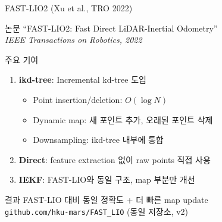 \begin{frame}{FAST-LIO2 (Xu et al., TRO 2022)}
  \begin{block}{논문}
    ``FAST-LIO2: Fast Direct LiDAR-Inertial Odometry''\\
    \textit{IEEE Transactions on Robotics, 2022}
  \end{block}
  \pause
  \begin{block}{주요 기여}
    \begin{enumerate}
      \item \textbf{ikd-tree}: Incremental kd-tree 도입
        \begin{itemize}
          \item Point insertion/deletion: $O(\log N)$
          \item Dynamic map: 새 포인트 추가, 오래된 포인트 삭제
          \item Downsampling: ikd-tree 내부에 통합
        \end{itemize}
      \item \textbf{Direct}: feature extraction 없이 raw points 직접 사용
      \item \textbf{IEKF}: FAST-LIO와 동일 구조, map 부분만 개선
    \end{enumerate}
  \end{block}
  \pause
  \begin{exampleblock}{결과}
    FAST-LIO 대비 동일 정확도 + 더 빠른 map update\\
    \texttt{github.com/hku-mars/FAST\_LIO} (동일 저장소, v2)
  \end{exampleblock}
\end{frame}


